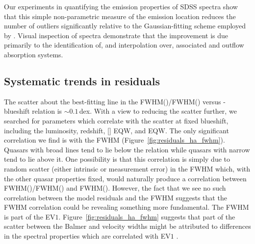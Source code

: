 Our experiments in quantifying the  emission properties of SDSS spectra show that this simple non-parametric measure of the  emission location reduces the number of outliers significantly relative to the Gaussian-fitting scheme employed by \citet{shen11}. 
Visual inspection of spectra demonstrate that the improvement is due primarily to the identification of, and interpolation over, associated and outflow absorption systems.

\subsection{Systematic trends in residuals}
\label{sec:ch3-residuals}

The scatter about the best-fitting line in the FWHM()/FWHM(\hans) versus -blueshift relation is $\sim0.1$\,dex. 
With a view to reducing the scatter further, we searched for parameters which correlate with the scatter at fixed  blueshift, including the luminosity, redshift, [] EQW, and  EQW.
The only significant correlation we find is with the \ha FWHM (Figure~\ref{fig:residuals_ha_fwhm}).
Quasars with broad \ha lines tend to lie below the relation while quasars with narrow \ha tend to lie above it.
One possibility is that this correlation is simply due to random scatter (either intrinsic or measurement error) in the \ha FWHM which, with the other quasar properties fixed, would naturally produce a correlation between FWHM()/FWHM(\hans) and FWHM(\hans).
However, the fact that we see no such correlation between the model residuals and the  FWHM suggests that the \ha FWHM correlation could be revealing something more fundamental. 
The \hans FWHM is part of the \citet{boroson92} EV$1$. 
Figure~\ref{fig:residuals_ha_fwhm} suggests that part of the scatter between the Balmer and  velocity widths might be attributed to differences in the spectral properties which are correlated with EV$1$ \citep{marziani13}. 

